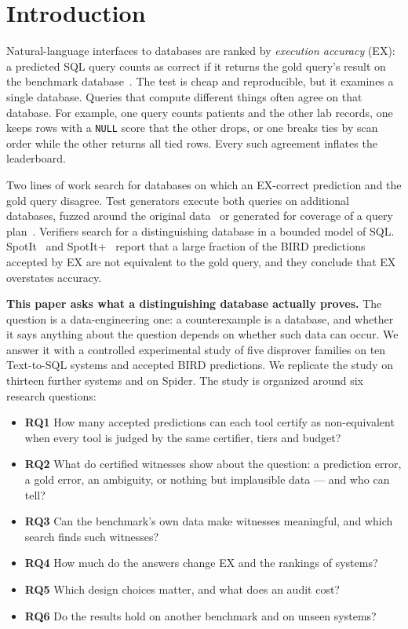 \section{Introduction}\label{sec:intro}


Natural-language interfaces to databases are ranked by \emph{execution accuracy} (EX): a predicted SQL query counts as correct if it returns the gold query's result on the benchmark database~\cite{yu2018spider,li2023bird}. The test is cheap and reproducible, but it examines a single database. Queries that compute different things often agree on that database. For example, one query counts patients and the other lab records, one keeps rows with a \texttt{NULL} score that the other drops, or one breaks ties by scan order while the other returns all tied rows. Every such agreement inflates the leaderboard.

Two lines of work search for databases on which an EX-correct prediction and the gold query disagree. Test generators execute both queries on additional databases, fuzzed around the original data~\cite{zhong2020testsuite} or generated for coverage of a query plan~\cite{chen2025parseval}. Verifiers search for a distinguishing database in a bounded model of SQL. SpotIt~\cite{klopfenstein2026spotit} and SpotIt+~\cite{tremante2026spotitplus} report that a large fraction of the BIRD predictions accepted by EX are not equivalent to the gold query, and they conclude that EX overstates accuracy.

\textbf{This paper asks what a distinguishing database actually proves.} The question is a data-engineering one: a counterexample is a database, and whether it says anything about the question depends on whether such data can occur. We answer it with a controlled experimental study of five disprover families on ten Text-to-SQL systems and  accepted BIRD predictions. We replicate the study on thirteen further systems and on Spider. The study is organized around six research questions:
\begin{itemize}
\item \textbf{RQ1} How many accepted predictions can each tool certify as non-equivalent when every tool is judged by the same certifier, tiers and budget?
\item \textbf{RQ2} What do certified witnesses show about the question: a prediction error, a gold error, an ambiguity, or nothing but implausible data --- and who can tell?
\item \textbf{RQ3} Can the benchmark's own data make witnesses meaningful, and which search finds such witnesses?
\item \textbf{RQ4} How much do the answers change EX and the rankings of systems?
\item \textbf{RQ5} Which design choices matter, and what does an audit cost?
\item \textbf{RQ6} Do the results hold on another benchmark and on unseen systems?
\end{itemize}

